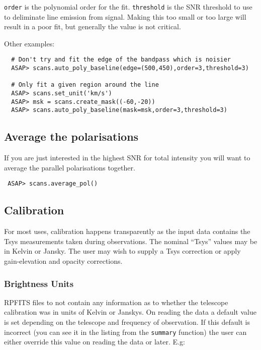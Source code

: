 \documentclass[11pt]{article}
\newcommand{\cmd}[1]{{\tt #1}}
\begin{document}
\cmd{order} is the polynomial order for the fit. \cmd{threshold} is
the SNR threshold to use to deliminate line emission from
signal. Making this too small or too large will result in a poor fit,
but generally the value is not critical.

Other examples:

\begin{verbatim}
  # Don't try and fit the edge of the bandpass which is noisier
  ASAP> scans.auto_poly_baseline(edge=(500,450),order=3,threshold=3)

  # Only fit a given region around the line
  ASAP> scans.set_unit('km/s')
  ASAP> msk = scans.create_mask((-60,-20))
  ASAP> scans.auto_poly_baseline(mask=msk,order=3,threshold=3)

\end{verbatim}

\subsection{Average the polarisations}

If you are just interested in the highest SNR for total intensity you
will want to average the parallel polarisations together.

\begin{verbatim}
 ASAP> scans.average_pol()
\end{verbatim}

\subsection{Calibration}

For most uses, calibration happens transparently as the input data
contains the Tsys measurements taken during observations. The nominal
``Tsys'' values may be in Kelvin or Jansky. The user may wish to
supply a Tsys correction or apply gain-elevation and opacity
corrections.

\subsubsection{Brightness Units}

RPFITS files to not contain any information as to whether the telescope
calibration was in units of Kelvin or Janskys.  On reading the data a
default value is set depending on the telescope and frequency of
observation.  If this default is incorrect (you can see it in the
listing from the \cmd{summary} function) the user can either override
this value on reading the data or later.  E.g:
\end{document}
